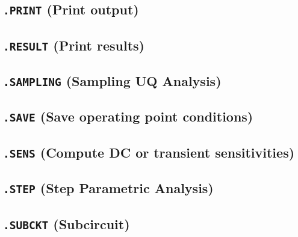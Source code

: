 

\newpage
\subsection{\texttt{.PRINT} (Print output)}\label{.PRINT}


\newpage
\subsection{\texttt{.RESULT} (Print results)}\label{.RESULT}


\newpage
\subsection{\texttt{.SAMPLING} (Sampling UQ Analysis)}\label{.SAMPLING}


\newpage
\subsection{\texttt{.SAVE} (Save operating point conditions)}


\newpage
\subsection{\texttt{.SENS} (Compute DC or transient sensitivities)}
\label{SensitivityAnalysis}


\newpage
\subsection{\texttt{.STEP} (Step Parametric Analysis)}\label{.STEP}


\newpage
\subsection{\texttt{.SUBCKT} (Subcircuit)}
\label{SubcircuitDefinition}


